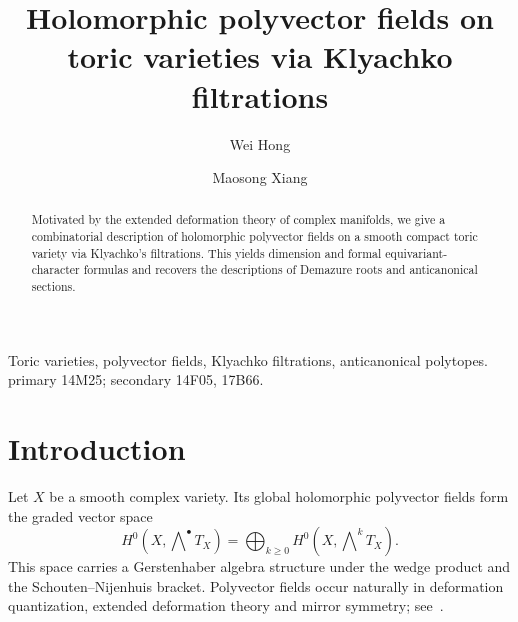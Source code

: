 \documentclass[colorlinks,11pt,reqno]{amsart}
\theoremstyle{definition}
\theoremstyle{remark}
\numberwithin{equation}{section}
\numberwithin{equation}{section}
\begin{document}
\title{Holomorphic polyvector fields on toric varieties via Klyachko filtrations}

\author{Wei Hong}
\address{School of Mathematics and Statistics, Wuhan University, Wuhan, 430072, China}

\author{Maosong Xiang}
\address{School of Mathematics and Statistics, Center for Mathematical Sciences, Huazhong University of Science and Technology, Wuhan, China.}


\begin{abstract}
Motivated by the extended deformation theory of complex manifolds, we give a combinatorial description of holomorphic polyvector fields on a smooth compact toric variety via Klyachko's filtrations.
This yields dimension and formal equivariant-character formulas and recovers the descriptions of Demazure roots and anticanonical sections.
\end{abstract}

\maketitle

 \hspace*{0.6cm}
Toric varieties, polyvector fields, Klyachko filtrations, anticanonical polytopes. \\
\hspace*{0.5cm}  primary 14M25; secondary 14F05, 17B66.


\tableofcontents


\section{Introduction}\label{sect-Intr}

Let \(X\) be a smooth complex variety. Its global holomorphic polyvector fields form the graded vector space
\[
H^0\!\left(X,\bigwedge\nolimits^\bullet T_X\right) = \bigoplus_{k\geq0}
H^0\!\left(X,\bigwedge\nolimits^kT_X\right).
\]
This space carries a Gerstenhaber algebra structure under the wedge product and the Schouten--Nijenhuis bracket. Polyvector fields occur naturally in deformation quantization, extended deformation theory and mirror symmetry; see~\cites{BCOV, B-K 98, Kon}.
\end{document}
